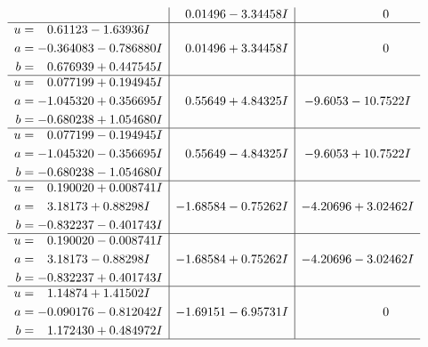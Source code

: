 \documentclass[1p]{elsarticle_modified}
\theoremstyle{definition}
\begin{document}
$$\begin{array}{c|c|c}
 & \phantom{-}0.01496 - 3.34458 I & \phantom{-0.000000 } 0 \\ \hline\begin{aligned}
u &= \phantom{-}0.61123 - 1.63936 I \\
a &= -0.364083 - 0.786880 I \\
b &= \phantom{-}0.676939 + 0.447545 I\end{aligned}
 & \phantom{-}0.01496 + 3.34458 I & \phantom{-0.000000 } 0 \\ \hline\begin{aligned}
u &= \phantom{-}0.077199 + 0.194945 I \\
a &= -1.045320 + 0.356695 I \\
b &= -0.680238 + 1.054680 I\end{aligned}
 & \phantom{-}0.55649 + 4.84325 I & -9.6053 - 10.7522 I \\ \hline\begin{aligned}
u &= \phantom{-}0.077199 - 0.194945 I \\
a &= -1.045320 - 0.356695 I \\
b &= -0.680238 - 1.054680 I\end{aligned}
 & \phantom{-}0.55649 - 4.84325 I & -9.6053 + 10.7522 I \\ \hline\begin{aligned}
u &= \phantom{-}0.190020 + 0.008741 I \\
a &= \phantom{-}3.18173 + 0.88298 I \\
b &= -0.832237 - 0.401743 I\end{aligned}
 & -1.68584 - 0.75262 I & -4.20696 + 3.02462 I \\ \hline\begin{aligned}
u &= \phantom{-}0.190020 - 0.008741 I \\
a &= \phantom{-}3.18173 - 0.88298 I \\
b &= -0.832237 + 0.401743 I\end{aligned}
 & -1.68584 + 0.75262 I & -4.20696 - 3.02462 I \\ \hline\begin{aligned}
u &= \phantom{-}1.14874 + 1.41502 I \\
a &= -0.090176 - 0.812042 I \\
b &= \phantom{-}1.172430 + 0.484972 I\end{aligned}
 & -1.69151 - 6.95731 I & \phantom{-0.000000 } 0\\
 \hline 
 \end{array}$$\newpage$$\begin{array}{c|c|c}  

\end{array}$$
\end{document}
